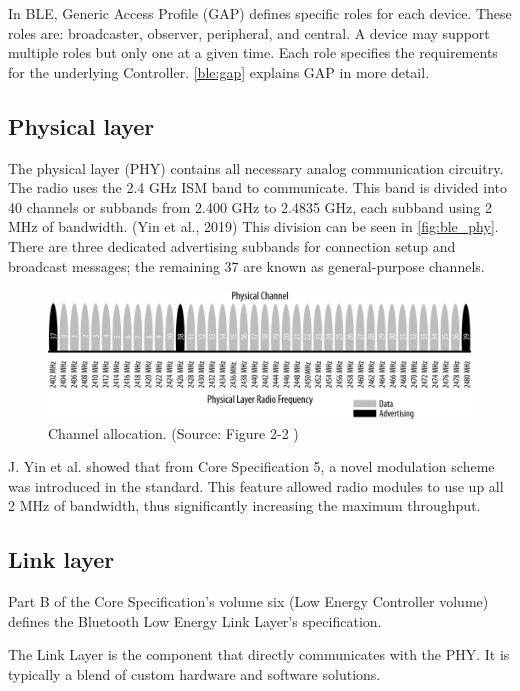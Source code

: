In BLE, Generic Access Profile (GAP) defines specific roles for each device.
These roles are: broadcaster, observer, peripheral, and central.
A device may support multiple roles but only one at a given time.
Each role specifies the requirements for the underlying Controller.
\autoref{ble:gap} explains GAP in more detail.


\subsection{Physical layer}
\label{ble:phy}

The physical layer (PHY) contains all necessary analog communication circuitry.
The radio uses the 2.4 GHz ISM band to communicate.
This band is divided into 40 channels or subbands from 2.400 GHz to 2.4835 GHz,
each subband using 2 MHz of bandwidth. (Yin et al., 2019)
This division can be seen in \autoref{fig:ble_phy}.
There are three dedicated advertising subbands for connection setup and
broadcast messages; the remaining 37 are known as general-purpose channels.

\begin{figure}[!ht]
    \centering
    \includegraphics[width=150mm, keepaspectratio]{figures/ble_phy.png}
    \caption{Channel allocation. (Source: Figure 2-2 \cite{Townsend14})}
    \label{fig:ble_phy}
\end{figure}

J. Yin et al. \cite{Yin:19} showed that from Core Specification 5, a novel
modulation scheme was introduced in the standard.
This feature allowed radio modules to use up all 2 MHz of bandwidth,
thus significantly increasing the maximum throughput.

\subsection{Link layer}
\label{ble:link}
Part B of the Core Specification's volume six (Low Energy Controller volume)
defines the Bluetooth Low Energy Link Layer's specification.

The Link Layer is the component that directly communicates with the PHY.
It is typically a blend of custom hardware and software solutions. \cite{Townsend14}

